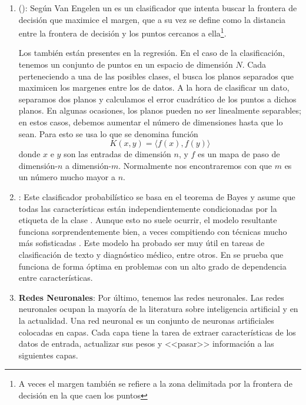\begin{enumerate}
  \item \textbf{} (): Según Van Engelen \et {} un  es un clasificador que intenta buscar la frontera de decisión que maximice el margen, que a su vez se define como la distancia entre la frontera de decisión y los puntos cercanos a ella\footnote{A veces el margen también se refiere a la zona delimitada por la frontera de decisión en la que caen los puntos}.

        Los  también están presentes en la regresión. En el caso de la clasificación, tenemos un conjunto de puntos en un espacio de dimensión $N$. Cada  perteneciendo a una de las posibles clases, el  busca los planos separados que maximicen los margenes entre los  de datos. A la hora de clasificar un dato, separamos dos planos y calculamos el error cuadrático de los puntos a dichos planos. En algunas ocasiones, los planos pueden no ser linealmente separables; en estos casos, debemos aumentar el número de dimensiones hasta que lo sean. Para esto se usa lo que se denomina función   \[K(x,y)=\langle f(x), f(y) \rangle \] donde $x$ e $y$ son las entradas de dimensión $n$, y $f$ es un mapa de paso de dimensión-$n$ a dimensión-$m$. Normalmente nos encontraremos con que $m$ es un número mucho mayor a $n$.

  \item \textbf{}: Este clasificador probabilístico se basa en el teorema de Bayes y asume que todas las características están independientemente condicionadas por la etiqueta de la clase . Aunque esto no suele ocurrir, el modelo resultante funciona sorprendentemente bien, a veces compitiendo con técnicas mucho más sofisticadas . Este modelo ha probado ser muy útil en tareas de clasificación de texto y diagnóstico médico, entre otros. En  se prueba que  funciona de forma óptima en problemas con un alto grado de dependencia entre características.

  \item \textbf{Redes Neuronales}: Por último, tenemos las redes neuronales. Las redes neuronales ocupan la mayoría de la literatura sobre inteligencia artificial y  en la actualidad. Una red neuronal es un conjunto de neuronas artificiales colocadas en capas. Cada capa tiene la tarea de extraer características de los datos de entrada, actualizar sus pesos y <<pasar>> información a las siguientes capas.


\end{enumerate}
